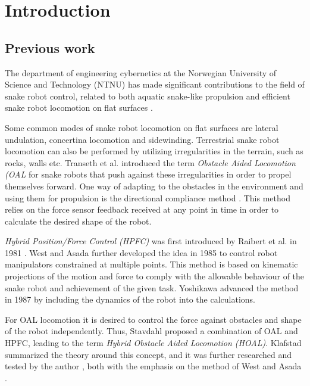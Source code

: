 
\chapter{Introduction}\label{Chapter:introduction}

\section{Previous work}

The department of engineering cybernetics at the Norwegian University of Science and Technology (NTNU) has made significant contributions to the field of snake robot control, related to both aquatic snake-like propulsion and efficient snake robot locomotion on flat surfaces \cite{StavdahlNote}.

Some common modes of snake robot locomotion on flat surfaces are lateral undulation, concertina locomotion and sidewinding. Terrestrial snake robot locomotion can also be performed by utilizing irregularities in the terrain, such as rocks, walls etc. Transeth et al. \cite{transeth2008snake} introduced the term \textit{Obstacle Aided Locomotion (OAL} for snake robots that push against these irregularities in order to propel themselves forward. One way of adapting to the obstacles in the environment and using them for propulsion is the directional compliance method \cite{wang2020directional}. This method relies on the force sensor feedback received at any point in time in order to calculate the desired shape of the robot. 

\textit{Hybrid Position/Force Control (HPFC)} was first introduced by Raibert et al. in 1981 \cite{raibert1981hybrid}. West and Asada \cite{west1985method} further developed the idea in 1985 to control robot manipulators constrained at multiple points. This method is based on kinematic projections of the motion and force to comply with the allowable behaviour of the snake robot and achievement of the given task. Yoshikawa \cite{yoshikawa1987dynamic} advanced the method in 1987 by including the dynamics of the robot into the calculations. 

For OAL locomotion it is desired to control the force against obstacles and shape of the robot independently. Thus, Stavdahl \cite{StavdahlNote} proposed a combination of OAL and HPFC, leading to the term \textit{Hybrid Obstacle Aided Locomotion (HOAL)}. Klafstad \cite{TorjusOppg} summarized the theory around this concept, and it was further researched and tested by the author \cite{AtussaProsjektoppgp}, both with the emphasis on the method of West and Asada \cite{west1985method}.

